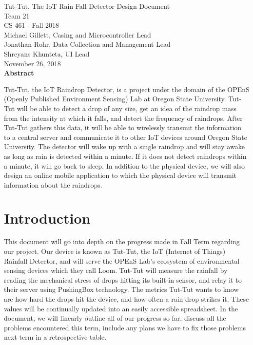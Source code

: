 \documentclass[letterpaper,10pt,draftclsnofoot,onecolumn]{article}
\begin{document}
\begin{titlepage}
\vspace*{\fill}
\begin{center}
{\Large Tut-Tut, The IoT Rain Fall Detector Design Document}
\\[0.3cm]

{\large Team 21}
\\[0.3cm]

{\large CS 461 - Fall 2018}
\\[0.3cm]

{\large Michael Gillett, Casing and Microcontroller Lead}
\\[0.3cm]
{\large Jonathan Rohr, Data Collection and Management Lead}
\\[0.3cm]
{\large Shreyans Khunteta, UI Lead}
\\[0.3cm]

{\large November 26, 2018}
\\[1cm]

{\Large \textbf{Abstract}}
\end{center}
 Tut-Tut, the IoT Raindrop Detector, is a project under the domain of the OPEnS (Openly Published Environment Sensing) Lab at Oregon State University. Tut-Tut will be able to detect a drop of any size, get an idea of the raindrop mass from the intensity at which it falls, and detect the frequency of raindrops. After Tut-Tut gathers this data, it will be able to wirelessly transmit the information to a central server and communicate it to other IoT devices around Oregon State University. The detector will wake up with a single raindrop and will stay awake as long as rain is detected within a minute. If it does not detect raindrops within a minute, it will go back to sleep. In addition to the physical device, we will also design an online mobile application to which the physical device will transmit information about the raindrops.
\vspace*{\fill}
\end{titlepage}

\section{Introduction}
This document will go into depth on the progress made in Fall Term regarding our project. Our device is known as Tut-Tut, the IoT (Internet of Things) Rainfall Detector, and will serve the OPEnS Lab's ecosystem of environmental sensing devices which they call Loom. Tut-Tut will measure the rainfall by reading the mechanical stress of drops hitting its built-in sensor, and relay it to their server using PushingBox technology. The metrics Tut-Tut wants to know are how hard the drops hit the device, and how often a rain drop strikes it. These values will be continually updated into an easily accessible spreadsheet. In the document, we will linearly outline all of our progress so far, discuss all the problems encountered this term, include any plans we have to fix those problems next term in a retrospective table.
\end{document}
